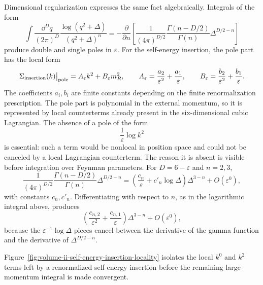 Dimensional regularization expresses the same fact algebraically.  Integrals
of the form
\[
  \int\frac{\dd^Dq}{(2\pi)^D}
  \frac{\log(q^2+\Delta)}
       {(q^2+\Delta)^n}
  =
  -\frac{\partial}{\partial n}
  \left[
    \frac1{(4\pi)^{D/2}}
    \frac{\Gamma(n-D/2)}{\Gamma(n)}
    \Delta^{D/2-n}
  \right]
\]
produce double and single poles in \(\varepsilon\).  For the self-energy
insertion, the pole part has the local form
\[
  \Sigma_{\rm insertion}(k)\big|_{\rm pole}
  =
  A_{\varepsilon}k^2+B_{\varepsilon}m_R^2,
  \qquad
  A_{\varepsilon}
  =
  \frac{a_2}{\varepsilon^2}+\frac{a_1}{\varepsilon},
  \qquad
  B_{\varepsilon}
  =
  \frac{b_2}{\varepsilon^2}+\frac{b_1}{\varepsilon}.
\]
The coefficients \(a_i,b_i\) are finite constants depending on the finite
renormalization prescription.  The pole part is polynomial in the external
momentum, so it is represented by local counterterms already present in the
six-dimensional cubic Lagrangian.
The absence of a pole of the form
\[
  \frac1{\varepsilon}\log k^2
\]
is essential: such a term would be nonlocal in position space and could not
be canceled by a local Lagrangian counterterm.  The reason it is absent is
visible before integration over Feynman parameters.  For \(D=6-\varepsilon\)
and \(n=2,3\),
\[
  \frac1{(4\pi)^{D/2}}
  \frac{\Gamma(n-D/2)}{\Gamma(n)}
  \Delta^{D/2-n}
  =
  \left(\frac{c_n}{\varepsilon}+c'_n\log\Delta\right)
  \Delta^{3-n}+O(\varepsilon^0),
\]
with constants \(c_n,c'_n\).  Differentiating with respect to \(n\), as in
the logarithmic integral above, produces
\[
  \left(
    \frac{c_{n,2}}{\varepsilon^2}
    +\frac{c_{n,1}}{\varepsilon}
  \right)\Delta^{3-n}
  +O(\varepsilon^0),
\]
because the \(\varepsilon^{-1}\log\Delta\) pieces cancel between the
derivative of the gamma function and the derivative of
\(\Delta^{D/2-n}\).

Figure~\ref{fig:volume-ii-self-energy-insertion-locality} isolates the local
\(k^0\) and \(k^2\) terms left by a renormalized self-energy insertion before
the remaining large-momentum integral is made convergent.

